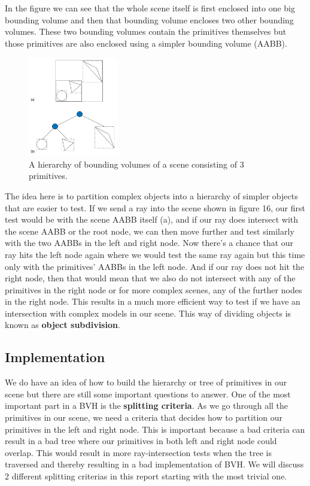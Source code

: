 \documentclass[11pt,a4paper]{article}
\begin{document}
\\~\\
\noindent
In the figure we can see that the whole scene itself is first enclosed into one big bounding volume and then that bounding volume encloses two other bounding volumes. These two bounding volumes contain the primitives themselves but those primitives are also enclosed using a simpler bounding volume (AABB).
\begin{figure}[H]
	\centering
	\captionsetup{justification=centering,margin=2cm}
	\includegraphics[width=0.35\textwidth]{bvh_pbr}
	\caption{A hierarchy of bounding volumes of a scene consisting of 3 primitives. \protect\cite{pharr2016physically}}
\end{figure}
The idea here is to partition complex objects into a hierarchy of simpler objects that are easier to test. If we send a ray into the scene shown in figure 16, our first test would be with the scene AABB itself (a), and if our ray does intersect with the scene AABB or the root node, we can then move further and test similarly with the two AABBs in the left and right node.  Now there's a chance that our ray hits the left node again where we would test the same ray again but this time only with the primitives' AABBs in the left node. And if our ray does not hit the right node, then that would mean that we also do not intersect with any of the primitives in the right node or for more complex scenes, any of the further nodes in the right node. This results in a much more efficient way to test if we have an intersection with complex models in our scene. This way of dividing objects is known as \textbf{object subdivision}.

\subsection{Implementation}
We do have an idea of how to build the hierarchy or tree of primitives in our scene but there are still some important questions to answer. One of the most important part in a BVH is the \textbf{splitting criteria}. As we go through all the primitives in our scene, we need a criteria that decides how to partition our primitives in the left and right node. This is important because a bad criteria can result in a bad tree where our primitives in both left and right node could overlap. This would result in more ray-intersection tests when the tree is traversed and thereby resulting in a bad implementation of BVH. We will discuss 2 different splitting criterias in this report starting with the most trivial one.
\end{document}
